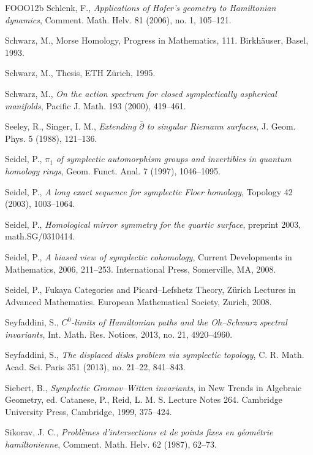 \begin{thebibliography}{FOOO12b}
 Schlenk, F., \emph{Applications of Hofer’s geometry to Hamiltonian dynamics},
  Comment. Math. Helv. 81 (2006), no. 1, 105–121.

 Schwarz, M., Morse Homology, Progress in Mathematics, 111. Birkhäuser, Basel,
  1993.

 Schwarz, M., Thesis, ETH Zürich, 1995.

 Schwarz, M., \emph{On the action spectrum for closed symplectically aspheri\-cal
  manifolds}, Pacific J. Math. 193 (2000), 419–461.

 Seeley, R., Singer, I. M., \emph{Extending $\bar\partial$ to singular Riemann
  surfaces}, J. Geom. Phys. 5 (1988), 121–136.

 Seidel, P., \emph{$\pi_1$ of symplectic automorphism groups and invertibles in
  quantum homology rings}, Geom. Funct. Anal. 7 (1997), 1046–1095.

 Seidel, P., \emph{A long exact sequence for symplectic Floer homology}, Topol\-ogy
  42 (2003), 1003–1064.

 Seidel, P., \emph{Homological mirror symmetry for the quartic surface}, preprint
  2003, math.SG/0310414.

 Seidel, P., \emph{A biased view of symplectic cohomology}, Current Develop\-ments in
  Mathematics, 2006, 211–253. International Press, Somerville, MA, 2008.

 Seidel, P., Fukaya Categories and Picard–Lefshetz Theory, Zürich Lectures in
  Advanced Mathematics. European Mathematical Society, Zurich, 2008.

 Seyfaddini, S., \emph{$C^0$-limits of Hamiltonian paths and the Oh–Schwarz
  spectral invariants}, Int. Math. Res. Notices, 2013, no. 21, 4920–4960.

 Seyfaddini, S., \emph{The displaced disks problem via symplectic topology}, C.
  R. Math. Acad. Sci. Paris 351 (2013), no. 21–22, 841–843.

 Siebert, B., \emph{Symplectic Gromov–Witten invariants}, in New Trends in
  Algebraic Geometry, ed. Catanese, P., Reid, L. M. S. Lecture Notes 264. Cambridge University Press,
  Cambridge, 1999, 375–424.

 Sikorav, J. C., \emph{Problèmes d’intersections et de points fixes en géométrie
  hamiltonienne}, Comment. Math. Helv. 62 (1987), 62–73.


\end{thebibliography}
